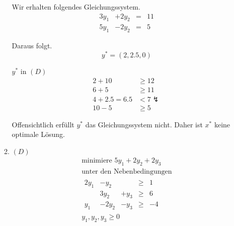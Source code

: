 \documentclass[a4paper]{scrartcl}
\begin{document}
\begin{enumerate}[label=\bfseries\arabic*.]
\begin{enumerate}
                Wir erhalten folgendes Gleichungssystem.
                \begin{equation}
                    \begin{array}{rrrcr}
                        3y_1 & +2y_2 & = & 11 \\
                        5y_1 & -2y_2 & = & 5
                    \end{array}
                \end{equation}

                Daraus folgt.
                \begin{equation}
                    y^* = \left( 2, 2.5, 0 \right)
                \end{equation}
                
                $y^*$ in $(D)$
                \begin{equation}
                    \begin{split}
                        2 + 10 &\geq 12 \\
                        6 + 5 &\geq 11 \\
                        4 + 2.5 = 6.5 &< 7 \lightning \\
                        10 - 5 &\geq 5
                    \end{split}
                \end{equation}
                
                Offensichtlich erfüllt $y^*$ das Gleichungssystem nicht.
                Daher ist $x^*$ keine optimale Lösung.

            \item $(D)$
                \begin{equation}
                    \begin{gathered}
                        \text{minimiere }
                        5y_1 +2y_2 +2y_3 \\
                        \text{unter den Nebenbedingungen} \\
                        \begin{array}{rrrcr}
                            2y_1 & -y_2 &  & \geq & 1 \\
                             & 3y_2 & +y_3 & \geq & 6 \\
                            y_1 & -2y_2 & -y_3 & \geq & -4
                        \end{array} \\
                        y_1, y_2, y_3 \geq 0
                    \end{gathered}
                \end{equation}


\end{enumerate}
\end{enumerate}
\end{document}
